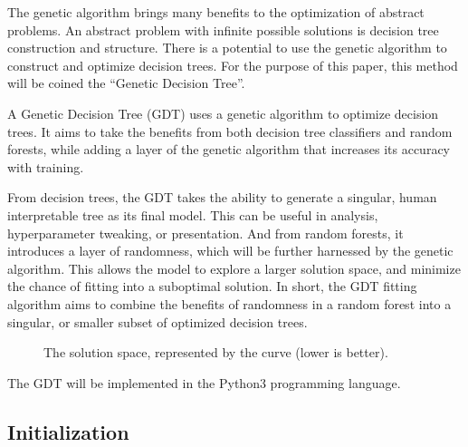 \documentclass[12pt]{article}
\begin{document}
The genetic algorithm brings many benefits to the optimization of abstract problems. An abstract problem with infinite possible solutions is decision tree construction and structure. There is a potential to use the genetic algorithm to construct and optimize decision trees. For the purpose of this paper, this method will be coined the ``Genetic Decision Tree''.

A Genetic Decision Tree (GDT) uses a genetic algorithm to optimize decision trees. It aims to take the benefits from both decision tree classifiers and random forests, while adding a layer of the genetic algorithm that increases its accuracy with training.

From decision trees, the GDT takes the ability to generate a singular, human interpretable tree as its final model. This can be useful in analysis, hyperparameter tweaking, or presentation. And from random forests, it introduces a layer of randomness, which will be further harnessed by the genetic algorithm. This allows the model to explore a larger solution space, and minimize the chance of fitting into a suboptimal solution. In short, the GDT fitting algorithm aims to combine the benefits of randomness in a random forest into a singular, or smaller subset of optimized decision trees.

\begin{figure}[H]
    \centering
    \caption{The solution space, represented by the curve (lower is better).}
    \label{fig:solutionspace}
\end{figure}

The GDT will be implemented in the Python3 programming language.

\subsection{Initialization}
\end{document}
